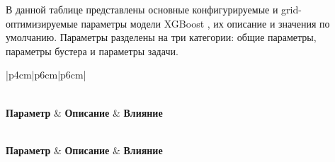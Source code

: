\documentclass[14pt, a4paper]{bsu}
\begin{document}
В данной таблице представлены основные конфигурируемые и grid-оптимизируемые
параметры модели XGBoost \cite{xgboost_parameters_docs}, их описание и значения
по умолчанию. Параметры разделены на три категории: общие параметры, параметры
бустера и параметры задачи.

\begin{longtable}{|p{4cm}|p{6cm}|p{6cm}|} \caption{Параметры XGBoost и их
		влияние}\label{tab:xgboost_params}
	\\

	\hline \textbf{Параметр}                          & \textbf{Описание}
	                                                  & \textbf{Влияние}
	\\ \hline \endfirsthead

	\\ \hline \textbf{Параметр}             & \textbf{Описание}
	                                                  & \textbf{Влияние}
	\\ \hline \endhead

	\hline {}
	\\ \hline \endfoot

	\hline \endlastfoot


\end{longtable}
\end{document}
